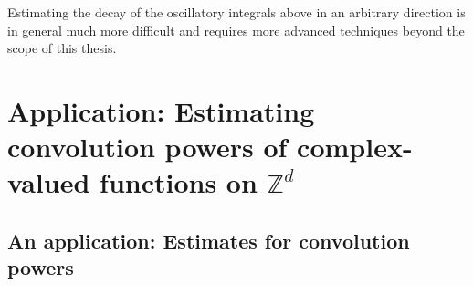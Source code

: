 \documentclass[11pt, letter]{book}
\begin{document}
Estimating the decay of the oscillatory integrals above in an arbitrary direction is in general much more difficult and requires more advanced techniques beyond the scope of this thesis.
















\chapter{Application: Estimating convolution powers of complex-valued functions on $\mathbb{Z}^d$}
\label{chap:Estimate-ConvPwr}

\section{An application: Estimates for convolution powers}\label{sec:ConvolutionPowers}
\end{document}
